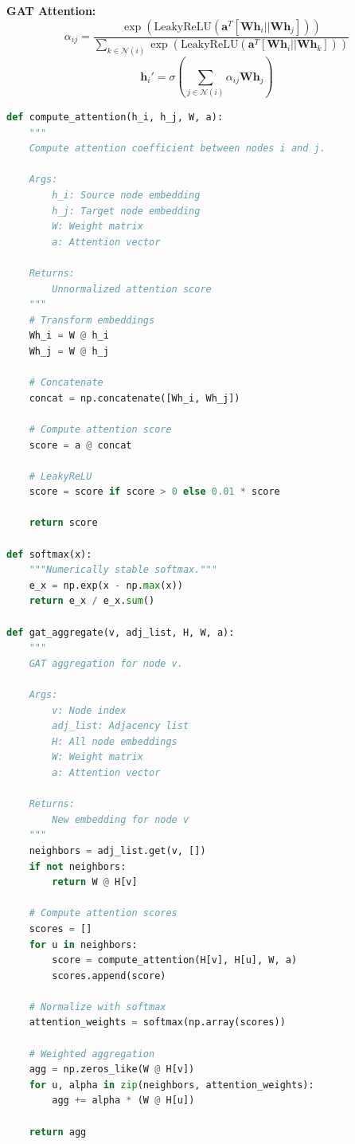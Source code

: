 \documentclass[12pt,a4paper]{article}
\begin{document}
\begin{mathbox}
\textbf{GAT Attention:}
\[
\alpha_{ij} = \frac{\exp\left(\text{LeakyReLU}\left(\mathbf{a}^T [\mathbf{W}\mathbf{h}_i || \mathbf{W}\mathbf{h}_j]\right)\right)}{\sum_{k \in \mathcal{N}(i)} \exp\left(\text{LeakyReLU}\left(\mathbf{a}^T [\mathbf{W}\mathbf{h}_i || \mathbf{W}\mathbf{h}_k]\right)\right)}
\]
\[
\mathbf{h}_i' = \sigma\left(\sum_{j \in \mathcal{N}(i)} \alpha_{ij} \mathbf{W}\mathbf{h}_j\right)
\]
\end{mathbox}

\begin{lstlisting}[language=Python,caption={Simplified GAT attention}]
def compute_attention(h_i, h_j, W, a):
    """
    Compute attention coefficient between nodes i and j.

    Args:
        h_i: Source node embedding
        h_j: Target node embedding
        W: Weight matrix
        a: Attention vector

    Returns:
        Unnormalized attention score
    """
    # Transform embeddings
    Wh_i = W @ h_i
    Wh_j = W @ h_j

    # Concatenate
    concat = np.concatenate([Wh_i, Wh_j])

    # Compute attention score
    score = a @ concat

    # LeakyReLU
    score = score if score > 0 else 0.01 * score

    return score

def softmax(x):
    """Numerically stable softmax."""
    e_x = np.exp(x - np.max(x))
    return e_x / e_x.sum()

def gat_aggregate(v, adj_list, H, W, a):
    """
    GAT aggregation for node v.

    Args:
        v: Node index
        adj_list: Adjacency list
        H: All node embeddings
        W: Weight matrix
        a: Attention vector

    Returns:
        New embedding for node v
    """
    neighbors = adj_list.get(v, [])
    if not neighbors:
        return W @ H[v]

    # Compute attention scores
    scores = []
    for u in neighbors:
        score = compute_attention(H[v], H[u], W, a)
        scores.append(score)

    # Normalize with softmax
    attention_weights = softmax(np.array(scores))

    # Weighted aggregation
    agg = np.zeros_like(W @ H[v])
    for u, alpha in zip(neighbors, attention_weights):
        agg += alpha * (W @ H[u])

    return agg
\end{lstlisting}
\end{document}
